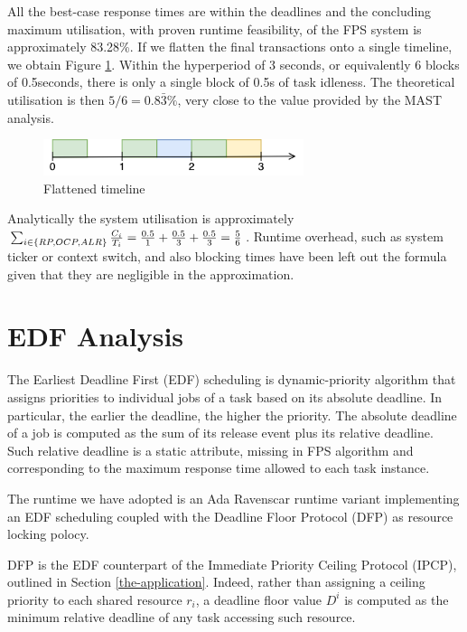 \documentclass{article}
\begin{document}
All the best-case response times are within the deadlines and the concluding maximum utilisation, with proven runtime feasibility, of the FPS system is approximately 83.28\%. If we flatten the final transactions onto a single timeline, we obtain Figure \ref{timeline-flatten}. Within the hyperperiod of 3 seconds, or equivalently 6 blocks of 0.5seconds, there is only a single block of 0.5s of task idleness. The theoretical utilisation is then $5 / 6 = 0.8\bar{3}\%$, very close to the value provided by the MAST analysis.

\begin{figure}[!htbp]
   \centering
   \includegraphics[width=3in]{images/timeline-flatten}
   \caption{Flattened timeline}
   \label{timeline-flatten}
   \end{figure}

Analytically the system utilisation is approximately $\sum_{i \in \{RP, OCP, ALR\}}{C_i \over T_i} = {0.5 \over 1} + {0.5 \over 3} + {0.5 \over 3} = {5 \over 6}$. Runtime overhead, such as system ticker or context switch, and also blocking times have been left out the formula given that they are negligible in the approximation.

\section{EDF Analysis}

The Earliest Deadline First (EDF) \cite{fps-vs-edf} scheduling is dynamic-priority algorithm that assigns priorities to individual jobs of a task based on its absolute deadline.
In particular, the earlier the deadline, the higher the priority.
The absolute deadline of a job is computed as the sum of its release event plus its relative deadline. Such relative deadline is a static attribute, missing in FPS algorithm and corresponding to the maximum response time allowed to each task instance.

The runtime we have adopted is an Ada Ravenscar runtime variant implementing an EDF scheduling coupled with the Deadline Floor Protocol (DFP) \cite{resource-sharing} as resource locking polocy.

DFP is the EDF counterpart of the Immediate Priority Ceiling Protocol (IPCP), outlined in Section \ref{the-application}. Indeed, rather than assigning a ceiling priority to each shared resource $r_i$, a deadline floor value $D^i$ is computed as the minimum relative deadline of any task accessing such resource.
\end{document}
